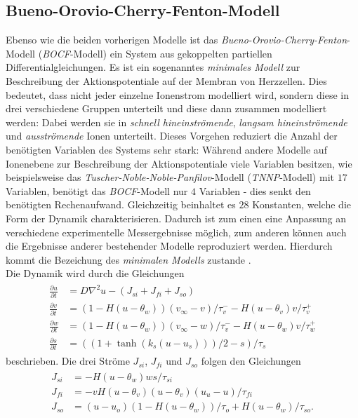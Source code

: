 \subsection{Bueno-Orovio-Cherry-Fenton-Modell}
Ebenso wie die beiden vorherigen Modelle ist das \textit{Bueno-Orovio-Cherry-Fenton}-Modell (\textit{BOCF}-Modell) ein System aus gekoppelten partiellen Differentialgleichungen. Es ist ein sogenanntes \textit{minimales Modell} zur Beschreibung der Aktionspotentiale auf der Membran von Herzzellen. Dies bedeutet, dass nicht jeder einzelne Ionenstrom modelliert wird, sondern diese in drei verschiedene Gruppen unterteilt und diese dann zusammen modelliert werden: Dabei werden sie in \textit{schnell hineinströmende}, \textit{langsam hineinströmende} und \textit{ausströmende} Ionen unterteilt. Dieses Vorgehen reduziert die Anzahl der benötigten Variablen des Systems sehr stark: Während andere Modelle auf Ionenebene zur Beschreibung der Aktionspotentiale viele Variablen besitzen, wie beispielsweise das \textit{Tuscher-Noble-Noble-Panfilov}-Modell (\textit{TNNP}-Modell) mit $17$ Variablen, benötigt das \textit{BOCF}-Modell nur $4$ Variablen - dies senkt den benötigten Rechenaufwand. Gleichzeitig beinhaltet es $28$ Konstanten, welche die Form der Dynamik charakterisieren. Dadurch ist zum einen eine Anpassung an verschiedene experimentelle Messergebnisse möglich, zum anderen können auch die Ergebnisse anderer bestehender Modelle reproduziert werden. Hierdurch kommt die Bezeichung des \textit{minimalen Modells} zustande \citep{Bueno-Orovio2008}.\\

Die Dynamik wird durch die Gleichungen 
\begin{align}
\begin{aligned}
\frac{\partial u}{\partial t} &= D \nabla^2 u - (J_{si} + J_{fi} + J_{so})\\
\frac{\partial v}{\partial t} &= \left(1-H(u-\theta_w)\right)(v_\infty - v)/\tau_v^- - H(u-\theta_v)v/\tau_v^+ \\
\frac{\partial w}{\partial t} &= (1-H(u-\theta_w))(v_\infty - w)/\tau_v^- - H(u-\theta_w)v/\tau_w^+ \\
\frac{\partial s}{\partial t} &= ((1 + \tanh(k_s(u-u_s)))/2 - s)/\tau_s
\end{aligned}
\end{align}
beschrieben. Die drei Ströme $J_{si}$, $J_{fi}$ und $J_{so}$ folgen den Gleichungen
\begin{align}
\begin{aligned}
J_{si} &= -H(u-\theta_w)ws/\tau_{si} \\
J_{fi} &= -vH(u-\theta_v)(u-\theta_v)(u_u - u)/\tau_{fi} \\
J_{so} &= (u-u_o)(1-H(u-\theta_w))/\tau_o + H(u-\theta_w)/\tau_{so}.
\end{aligned}
\end{align}

